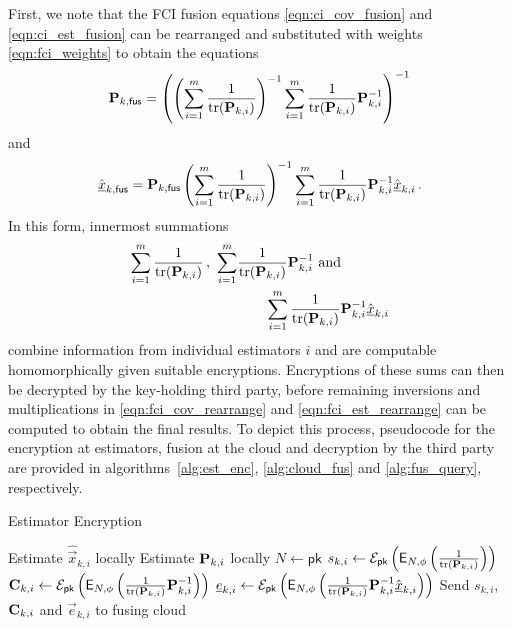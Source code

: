 \documentclass[letterpaper, 10 pt, conference]{ieeeconf}
\begin{document}
First, we note that the FCI fusion equations \eqref{eqn:ci_cov_fusion} and \eqref{eqn:ci_est_fusion} can be rearranged and substituted with weights \eqref{eqn:fci_weights} to obtain the equations
\begin{equation}\label{eqn:fci_cov_rearrange}
    {\ensuremath{{\mathbf{P}}}}_{k,\mathsf{fus}} = \left(\left(\sum_{i=1}^m \frac{1}{\operatorname{tr}({{\mathbf{P}}}_{k,i})}\right)^{-1}\sum_{i=1}^m \frac{1}{\operatorname{tr}({{\mathbf{P}}}_{k,i})}{{\mathbf{P}}}_{k,i}^{-1}\right)^{-1}
\end{equation}
and
\begin{equation}\label{eqn:fci_est_rearrange}
    \hat{{\underline{x}}}_{k,\mathsf{fus}} = {{\mathbf{P}}}_{k,\mathsf{fus}}\left(\sum_{i=1}^m \frac{1}{\operatorname{tr}({{\mathbf{P}}}_{k,i})}\right)^{-1}\sum_{i=1}^m\frac{1}{\operatorname{tr}({{\mathbf{P}}}_{k,i})}{{\mathbf{P}}}_{k,i}^{-1}\hat{{\underline{x}}}_{k,i}\,.
\end{equation}
In this form, innermost summations  
\begin{equation}
    \begin{split}
        \sum_{i=1}^m \frac{1}{\operatorname{tr}({{\mathbf{P}}}_{k,i})}\,,\ \sum_{i=1}^m &\frac{1}{\operatorname{tr}({{\mathbf{P}}}_{k,i})}{{\mathbf{P}}}_{k,i}^{-1}\text{ and }\\ 
        &\qquad\sum_{i=1}^m\frac{1}{\operatorname{tr}({{\mathbf{P}}}_{k,i})}{{\mathbf{P}}}_{k,i}^{-1}\hat{{\underline{x}}}_{k,i}
    \end{split}
\end{equation}
combine information from individual estimators $i$ and are computable homomorphically given suitable encryptions. Encryptions of these sums can then be decrypted by the key-holding third party, before remaining inversions and multiplications in \eqref{eqn:fci_cov_rearrange} and \eqref{eqn:fci_est_rearrange} can be computed to obtain the final results. To depict this process, pseudocode for the encryption at estimators, fusion at the cloud and decryption by the third party are provided in algorithms~\ref{alg:est_enc}, \ref{alg:cloud_fus} and \ref{alg:fus_query}, respectively.
\begin{algorithm}[htbp]
\caption{Estimator Encryption}\label{alg:est_enc}
\begin{algorithmic}[1]
    \State Estimate $\hat{\vec{x}}_{k,i}$ locally
    \State Estimate ${{\mathbf{P}}}_{k,i}$ locally
    \State $N \gets \mathsf{pk}$
    \State $s_{k,i} \gets \mathcal{E}_{\mathsf{pk}}\left(\mathsf{E}_{N,\phi}\left(\frac{1}{\operatorname{tr}({{\mathbf{P}}}_{k,i})}\right)\right)$
    \State ${{\mathbf{C}}}_{k,i} \gets \mathcal{E}_{\mathsf{pk}}\left(\mathsf{E}_{N,\phi}\left(\frac{1}{\operatorname{tr}({{\mathbf{P}}}_{k,i})}{{\mathbf{P}}}_{k,i}^{-1}\right)\right)$
    \State ${\underline{e}}_{k,i} \gets \mathcal{E}_{\mathsf{pk}}\left(\mathsf{E}_{N,\phi}\left(\frac{1}{\operatorname{tr}({{\mathbf{P}}}_{k,i})}{{\mathbf{P}}}_{k,i}^{-1}\hat{{\underline{x}}}_{k,i}\right)\right)$
    \State Send $s_{k,i}$, ${{\mathbf{C}}}_{k,i}$ and $\vec{e}_{k,i}$ to fusing cloud
    \EndProcedure
\end{algorithmic}
\end{algorithm}
\end{document}

